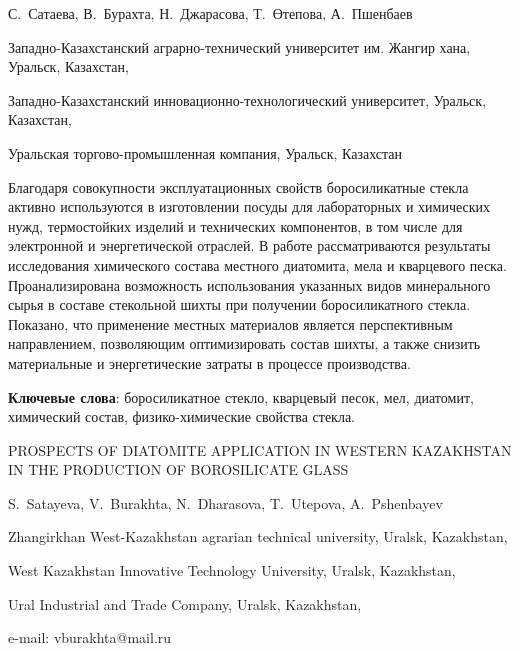 
\begin{header}

С.~Сатаева,
В.~Бурахта\envelope,
Н.~Джарасова,
Т.~Өтепова,
А.~Пшенбаев
\end{header}

\begin{affil}
Западно-Казахстанский аграрно-технический университет им. Жангир хана, Уральск, Казахстан,

Западно-Казахстанский инновационно-технологический университет, Уральск, Казахстан,

Уральская торгово-промышленная компания, Уральск, Казахстан

\end{affil}

Благодаря совокупности эксплуатационных свойств боросиликатные стекла
активно используются в изготовлении посуды для лабораторных и химических
нужд, термостойких изделий и технических компонентов, в том числе для
электронной и энергетической отраслей. В работе рассматриваются
результаты исследования химического состава местного диатомита, мела и
кварцевого песка. Проанализирована возможность использования указанных
видов минерального сырья в составе стекольной шихты при получении
боросиликатного стекла. Показано, что применение местных материалов
является перспективным направлением, позволяющим оптимизировать состав
шихты, а также снизить материальные и энергетические затраты в процессе
производства.

{\bfseries Ключевые слова}: боросиликатное стекло, кварцевый песок, мел,
диатомит, химический состав, физико-химические свойства стекла.

\begin{header}
PROSPECTS OF DIATOMITE APPLICATION IN WESTERN KAZAKHSTAN IN THE PRODUCTION OF BOROSILICATE GLASS

S.~Satayeva,
V.~Burakhta\envelope,
N.~Dharasova,
T.~Utepova,
A.~Pshenbayev
\end{header}

\begin{affil}
Zhangirkhan West-Kazakhstan agrarian technical university, Uralsk, Kazakhstan,

West Kazakhstan Innovative Technology University, Uralsk, Kazakhstan,

Ural Industrial and Trade Company, Uralsk, Kazakhstan,

e-mail: vburakhta@mail.ru
\end{affil}

